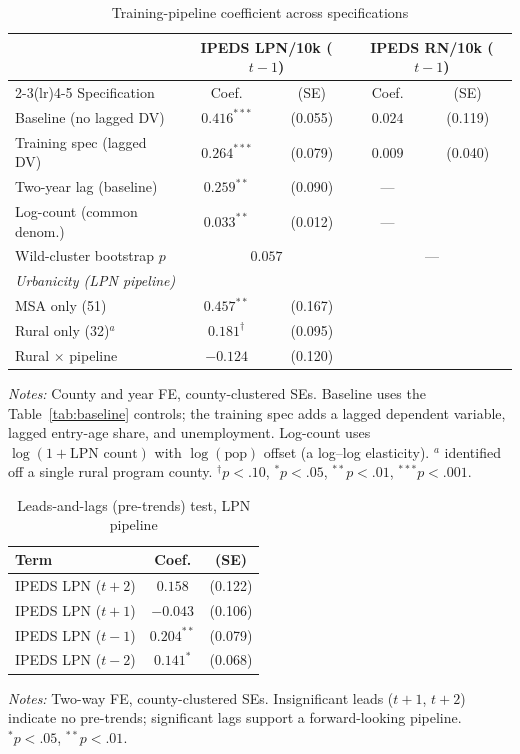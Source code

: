 \begin{table}[!htbp]
\centering
\caption{Training-pipeline coefficient across specifications}
\label{tab:training}
\small
\begin{tabular}{lcccc}
\toprule
 & \multicolumn{2}{c}{IPEDS LPN/10k ($t-1$)} & \multicolumn{2}{c}{IPEDS RN/10k ($t-1$)} \\
\cmidrule(lr){2-3}\cmidrule(lr){4-5}
Specification & Coef. & (SE) & Coef. & (SE) \\
\midrule
Baseline (no lagged DV) & $0.416^{***}$ & (0.055) & $0.024$ & (0.119) \\
Training spec (lagged DV) & $0.264^{***}$ & (0.079) & $0.009$ & (0.040) \\
Two-year lag (baseline) & $0.259^{**}$ & (0.090) & --- &  \\
Log-count (common denom.) & $0.033^{**}$ & (0.012) & --- &  \\
\quad Wild-cluster bootstrap $p$ & \multicolumn{2}{c}{$0.057$} & \multicolumn{2}{c}{---} \\
\midrule
\multicolumn{5}{l}{\textit{Urbanicity (LPN pipeline)}} \\
\quad MSA only (51) & $0.457^{**}$ & (0.167) & & \\
\quad Rural only (32)$^{a}$ & $0.181^{\dagger}$ & (0.095) & & \\
\quad Rural $\times$ pipeline & $-0.124$ & (0.120) & & \\
\bottomrule
\end{tabular}
\par\medskip\footnotesize\textit{Notes:} County and year FE, county-clustered SEs. Baseline uses the Table~\ref{tab:baseline} controls; the training spec adds a lagged dependent variable, lagged entry-age share, and unemployment. Log-count uses $\log(1+\text{LPN count})$ with $\log(\text{pop})$ offset (a log--log elasticity). $^{a}$ identified off a single rural program county. $^{\dagger}p<.10$, $^{*}p<.05$, $^{**}p<.01$, $^{***}p<.001$.
\end{table}

\begin{table}[!htbp]
\centering
\caption{Leads-and-lags (pre-trends) test, LPN pipeline}
\label{tab:pretrends}
\small
\begin{tabular}{lcc}
\toprule
Term & Coef. & (SE) \\
\midrule
IPEDS LPN ($t+2$) & $0.158$ & (0.122) \\
IPEDS LPN ($t+1$) & $-0.043$ & (0.106) \\
IPEDS LPN ($t-1$) & $0.204^{**}$ & (0.079) \\
IPEDS LPN ($t-2$) & $0.141^{*}$ & (0.068) \\
\bottomrule
\end{tabular}
\par\medskip\footnotesize\textit{Notes:} Two-way FE, county-clustered SEs. Insignificant leads ($t+1$, $t+2$) indicate no pre-trends; significant lags support a forward-looking pipeline. $^{*}p<.05$, $^{**}p<.01$.
\end{table}